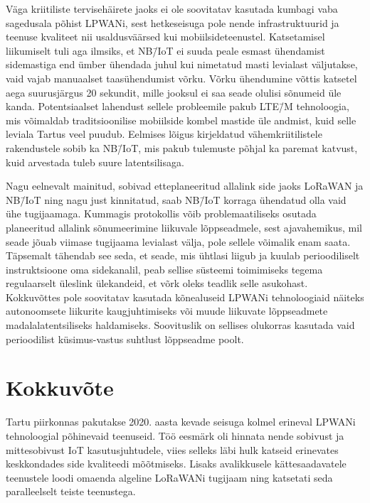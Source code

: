 \documentclass[12pt]{article}
\begin{document}
    Väga kriitiliste tervisehäirete jaoks ei ole soovitatav kasutada kumbagi vaba sagedusala põhist LPWANi, sest hetkeseisuga pole nende infrastruktuurid ja teenuse kvaliteet nii usaldusväärsed kui mobiilsideteenustel.
    Katsetamisel liikumiselt tuli aga ilmsiks, et NB\=/IoT ei suuda peale esmast ühendamist sidemastiga end ümber ühendada juhul kui nimetatud masti levialast väljutakse, vaid vajab manuaalset taasühendumist võrku.
    Võrku ühendumine võttis katsetel aega suurusjärgus 20 sekundit, mille jooksul ei saa seade olulisi sõnumeid üle kanda.
    Potentsiaalset lahendust sellele probleemile pakub LTE\=/M tehnoloogia, mis võimaldab traditsioonilise mobiilside kombel mastide üle andmist, kuid selle leviala Tartus veel puudub.
    Eelmises lõigus kirjeldatud vähemkriitilistele rakendustele sobib ka NB\=/IoT, mis pakub tulemuste põhjal ka paremat katvust, kuid arvestada tuleb suure latentsilisaga.

    Nagu eelnevalt mainitud, sobivad etteplaneeritud allalink side jaoks LoRaWAN ja NB\=/IoT ning nagu just kinnitatud, saab NB\=/IoT korraga ühendatud olla vaid ühe tugijaamaga.
    Kummagis protokollis võib problemaatiliseks osutada planeeritud allalink sõnumeerimine liikuvale lõppseadmele, sest ajavahemikus, mil seade jõuab viimase tugijaama levialast välja, pole sellele võimalik enam saata.
    Täpsemalt tähendab see seda, et seade, mis ühtlasi liigub ja kuulab perioodiliselt instruktsioone oma sidekanalil, peab sellise süsteemi toimimiseks tegema regulaarselt üleslink ülekandeid, et võrk oleks teadlik selle asukohast.
    Kokkuvõttes pole soovitatav kasutada kõnealuseid LPWANi tehnoloogiaid näiteks autonoomsete liikurite kaugjuhtimiseks või muude liikuvate lõppseadmete madalalatentsiliseks haldamiseks.
    Soovituslik on sellises olukorras kasutada vaid perioodilist küsimus-vastus suhtlust lõppseadme poolt.

    \newpage

    \section{Kokkuvõte}
    Tartu piirkonnas pakutakse 2020. aasta kevade seisuga kolmel erineval LPWANi tehnoloogial põhinevaid teenuseid.
    Töö eesmärk oli hinnata nende sobivust ja mittesobivust IoT kasutusjuhtudele, viies selleks läbi hulk katseid erinevates keskkondades side kvaliteedi mõõtmiseks.
    Lisaks avalikkusele kättesaadavatele teenustele loodi omaenda algeline LoRaWANi tugijaam ning katsetati seda paralleelselt teiste teenustega.
\end{document}
